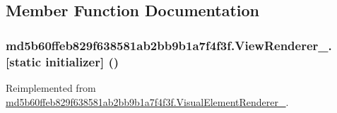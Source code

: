 \subsection{Member Function Documentation}
\hypertarget{classmd5b60ffeb829f638581ab2bb9b1a7f4f3f_1_1_view_renderer__2_a0898cf56fa9a49b653470eaf1608e77}{
\subsubsection[{[static initializer]}]{\setlength{\rightskip}{0pt plus 5cm}md5b60ffeb829f638581ab2bb9b1a7f4f3f.ViewRenderer\_.\mbox{[}static initializer\mbox{]} ()}}
\label{classmd5b60ffeb829f638581ab2bb9b1a7f4f3f_1_1_view_renderer__2_a0898cf56fa9a49b653470eaf1608e77}




Reimplemented from \hyperlink{classmd5b60ffeb829f638581ab2bb9b1a7f4f3f_1_1_visual_element_renderer__1_3ae26bd8575212fb6d6f14487b4f48d4}{md5b60ffeb829f638581ab2bb9b1a7f4f3f.VisualElementRenderer\_}.

